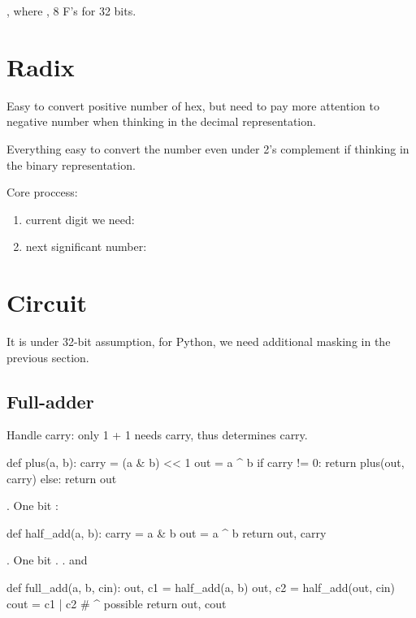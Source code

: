, where , 8 F's for 32 bits. 

\section{Radix}
 Easy to convert positive number of hex, but need to pay more attention to negative number when thinking in the decimal representation. 

Everything easy to convert the number even under 2's complement if thinking in the binary representation. 

Core proccess:
\begin{enumerate}
\item current digit we need: 
\item next significant number: 
\end{enumerate}
\section{Circuit}
It is under 32-bit assumption, for Python, we need additional masking in the previous section. 
\subsection{Full-adder}
 Handle carry: only 1 + 1 needs carry, thus  determines carry. 
\begin{python}
def plus(a, b):
  carry = (a & b) << 1
  out = a ^ b 
  if carry != 0:
    return plus(out, carry)
  else:
    return out
\end{python}
. One bit :
\begin{python}
def half_add(a, b): 
  carry = a & b
  out   = a ^ b 
  return out, carry 
\end{python}
. One bit . . and 
\begin{python}
def full_add(a, b, cin): 
  out, c1 = half_add(a, b)
  out, c2 = half_add(out, cin)
  cout    = c1 | c2  # ^ possible
  return out, cout 
\end{python}

